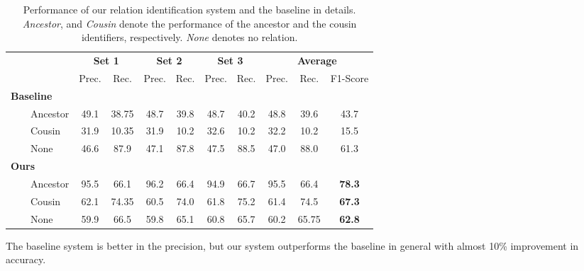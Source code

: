 \begin{table*}[ht]
	\centering
	{\small
	\begin{tabular}{|l||c|c||c|c||c|c||c|c|c|}
	\hline
                &    \multicolumn{2}{|c|}{{\bf Set 1}}  &   \multicolumn{2}{|c|}{{\bf Set 2}}    &   \multicolumn{2}{|c|}{{\bf Set 3}}  &  \multicolumn{3}{|c|}{{\bf Average}}   \\
                &    Prec.  &    Rec.  &    Prec.  &    Rec.  &    Prec.  &    Rec.  &    Prec.  &     Rec.  &  F1-Score  \\
	\hline
\hline
 {\bf Baseline}  &           &          &           &          &           &          &           &           &            \\
 $\qquad$Ancestor       &  49.1  &  38.75  &  48.7  &  39.8  &  48.7  &   40.2  &  48.8  &  39.6  &   43.7  \\
 $\qquad$Cousin         &  31.9  &  10.35  &  31.9  &  10.2  &  32.6  &  10.2  &  32.2  &  10.2  &   15.5  \\
 $\qquad$None    &  46.6  &   87.9  &  47.1  &  87.8  &  47.5  &  88.5  &  47.0  &  88.0  &   61.3  \\
\hline
	\hline
{\bf Ours}           &           &          &           &          &           &          &           &           &            \\
 $\qquad$Ancestor       &  95.5  &   66.1  &  96.2  &  66.4  &  94.9  &  66.7  &  95.5  &  66.4  &   {\bf 78.3}  \\
 $\qquad$Cousin         &  62.1  &  74.35  &  60.5  &  74.0  &  61.8  &   75.2  &  61.4  &    74.5  &   {\bf 67.3}  \\
 $\qquad$None    &  59.9  &   66.5  &  59.8  &  65.1  &  60.8  &   65.7  &  60.2  &   65.75  &   {\bf 62.8}  \\
	\hline
	\end{tabular}
	}
	\caption{Performance of our relation identification system and the baseline in details. {\em Ancestor}, and {\em Cousin} denote the performance of the ancestor and the cousin identifiers, respectively. {\em None} denotes no relation.}
	\label{table:exp3}
\end{table*}


The baseline system is better in the precision, but our system outperforms the baseline in general with almost 10\% improvement in accuracy.

